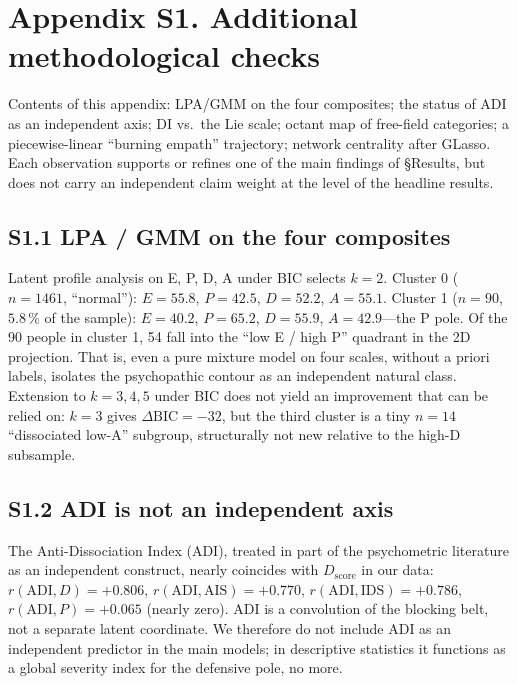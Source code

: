 
\appendix
\section*{Appendix S1. Additional methodological checks}
\label{supp:round3}

Contents of this appendix: LPA/GMM on the four composites; the status of ADI as an independent axis; DI vs.\ the Lie scale; octant map of free-field categories; a piecewise-linear ``burning empath'' trajectory; network centrality after GLasso. Each observation supports or refines one of the main findings of §Results, but does not carry an independent claim weight at the level of the headline results.

\subsection*{S1.1 LPA / GMM on the four composites}
Latent profile analysis on E, P, D, A under BIC selects $k=2$. Cluster 0 ($n = 1461$, ``normal''): $E = 55.8$, $P = 42.5$, $D = 52.2$, $A = 55.1$. Cluster 1 ($n = 90$, $5.8\,\%$ of the sample): $E = 40.2$, $P = 65.2$, $D = 55.9$, $A = 42.9$---the P pole. Of the 90 people in cluster 1, 54 fall into the ``low E / high P'' quadrant in the 2D projection. That is, even a pure mixture model on four scales, without a priori labels, isolates the psychopathic contour as an independent natural class. Extension to $k=3, 4, 5$ under BIC does not yield an improvement that can be relied on: $k=3$ gives $\Delta\mathrm{BIC} = -32$, but the third cluster is a tiny $n = 14$ ``dissociated low-A'' subgroup, structurally not new relative to the high-D subsample.

\subsection*{S1.2 ADI is not an independent axis}
The Anti-Dissociation Index (ADI), treated in part of the psychometric literature as an independent construct, nearly coincides with $D_{\mathrm{score}}$ in our data: $r(\mathrm{ADI}, D) = +0.806$, $r(\mathrm{ADI}, \mathrm{AIS}) = +0.770$, $r(\mathrm{ADI}, \mathrm{IDS}) = +0.786$, $r(\mathrm{ADI}, P) = +0.065$ (nearly zero). ADI is a convolution of the blocking belt, not a separate latent coordinate. We therefore do not include ADI as an independent predictor in the main models; in descriptive statistics it functions as a global severity index for the defensive pole, no more.

